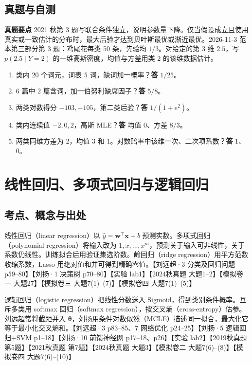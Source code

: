 \documentclass[UTF8,a4paper,zihao=-4,fontset=fandol]{ctexart}
\begin{document}
\subsection{真题与自测}
\textbf{真题要点} 2021 秋第 3 题写联合条件独立，说明参数量下降。仅当假设成立且使用真实或一致估计的分布时，最大后验才达到贝叶斯最优或渐近最优。2026-11-3 范本第三部分第 3 题：鸢尾花每类 50 条，先验均 \(1/3\)。对给定的第 3 维 \(2.5\)，写 \(p(2.5\mid Y=2)\) 的一维高斯密度，均值与方差用类 2 的该维数据估计。

\begin{enumerate}[nosep]
\item 类内 20 个词元，词表 5 词，缺词加一概率？\textbf{答} \(1/25\)。
\item 6 篇中 2 篇含词，加一伯努利缺席因子？\textbf{答} \(5/8\)。
\item 两类对数得分 \(-103,-105\)，第二类后验？\textbf{答} \(1/(1+e^2)\)。
\item 类内连续值 \(-2,0,2\)，高斯 MLE？\textbf{答} 均值 0、方差 \(8/3\)。
\item 两类同维方差为 2，均值 3 和 1。对数赔率中该维一次、二次项系数？\textbf{答} 1、0。
\end{enumerate}

\section{线性回归、多项式回归与逻辑回归}
\subsection{考点、概念与出处}
线性回归（linear regression）以 \(\hat y=\bm w^\top\bm x+b\) 预测实数。多项式回归（polynomial regression）将输入改为 \(1,x,\ldots,x^m\)，预测关于输入可非线性，关于系数仍线性。训练拟合后用验证集选阶数。岭回归（ridge regression）用平方范数收缩系数，Lasso 用绝对值和并可得到精确零值。【刘远超·3 分类及回归问题 p59--80】【刘扬·1 决策树 p70--80】【实验 lab1】【2024秋真题 大题1--2】【模拟卷一 大题27】【模拟卷三 大题7(1)--(7)】【模拟卷四 大题7(1)--(5)】
 
逻辑回归（logistic regression）把线性分数送入 Sigmoid，得到类别条件概率。互斥多类用 softmax 回归（softmax regression），按交叉熵（cross-entropy）估参。刘远超常将截距并入 \(\bm\theta\)，刘扬用条件对数似然（MCLE）描述同一拟合，最大化它等于最小化交叉熵和。【刘远超·3 p83--85、7 网络优化 p24--25】【刘扬·5 逻辑回归+SVM p1--18】【刘扬·10 前馈神经网 p17--18、p26】【实验 lab2】【2019秋真题 第5题】【2021秋真题 第7题】【2024秋真题 大题3】【模拟卷二 大题7(6)--(8)】【模拟卷四 大题7(6)--(10)】
\end{document}
